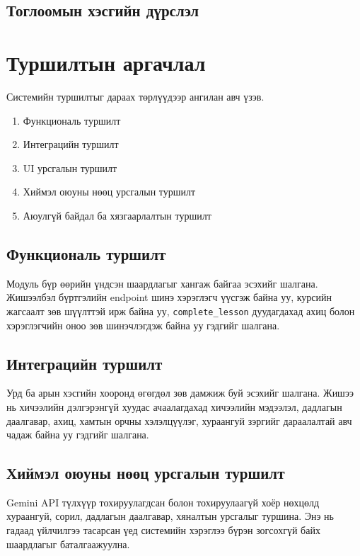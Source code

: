 \subsection{Тоглоомын хэсгийн дүрслэл}

\section{Туршилтын аргачлал}
Системийн туршилтыг дараах төрлүүдээр ангилан авч үзэв.
\begin{enumerate}
\item Функциональ туршилт
\item Интеграцийн туршилт
\item UI урсгалын туршилт
\item Хиймэл оюуны нөөц урсгалын туршилт
\item Аюулгүй байдал ба хязгаарлалтын туршилт
\end{enumerate}

\subsection{Функциональ туршилт}
Модуль бүр өөрийн үндсэн шаардлагыг хангаж байгаа эсэхийг шалгана. Жишээлбэл бүртгэлийн endpoint шинэ хэрэглэгч үүсгэж байна уу, курсийн жагсаалт зөв шүүлттэй ирж байна уу, \texttt{complete\_lesson} дуудагдахад ахиц болон хэрэглэгчийн оноо зөв шинэчлэгдэж байна уу гэдгийг шалгана.

\subsection{Интеграцийн туршилт}
Урд ба арын хэсгийн хооронд өгөгдөл зөв дамжиж буй эсэхийг шалгана. Жишээ нь хичээлийн дэлгэрэнгүй хуудас ачаалагдахад хичээлийн мэдээлэл, дадлагын даалгавар, ахиц, хамтын орчны хэлэлцүүлэг, хураангуй зэргийг дараалалтай авч чадаж байна уу гэдгийг шалгана.

\subsection{Хиймэл оюуны нөөц урсгалын туршилт}
Gemini API түлхүүр тохируулагдсан болон тохируулаагүй хоёр нөхцөлд хураангуй, сорил, дадлагын даалгавар, хяналтын урсгалыг туршина. Энэ нь гадаад үйлчилгээ тасарсан үед системийн хэрэглээ бүрэн зогсохгүй байх шаардлагыг баталгаажуулна.

